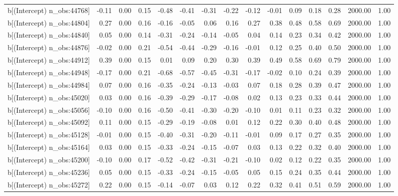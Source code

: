 \begin{table}[ht]
\begin{tabular}{rrrrrrrrrrrrrrr}
  b[(Intercept) n\_obs:44768] & -0.11 & 0.00 & 0.15 & -0.48 & -0.41 & -0.31 & -0.22 & -0.12 & -0.01 & 0.09 & 0.18 & 0.28 & 2000.00 & 1.00 \\ 
  b[(Intercept) n\_obs:44804] & 0.27 & 0.00 & 0.16 & -0.16 & -0.05 & 0.06 & 0.16 & 0.27 & 0.38 & 0.48 & 0.58 & 0.69 & 2000.00 & 1.00 \\ 
  b[(Intercept) n\_obs:44840] & 0.05 & 0.00 & 0.14 & -0.31 & -0.24 & -0.14 & -0.05 & 0.04 & 0.14 & 0.23 & 0.34 & 0.42 & 2000.00 & 1.00 \\ 
  b[(Intercept) n\_obs:44876] & -0.02 & 0.00 & 0.21 & -0.54 & -0.44 & -0.29 & -0.16 & -0.01 & 0.12 & 0.25 & 0.40 & 0.50 & 2000.00 & 1.00 \\ 
  b[(Intercept) n\_obs:44912] & 0.39 & 0.00 & 0.15 & 0.01 & 0.09 & 0.20 & 0.30 & 0.39 & 0.49 & 0.58 & 0.69 & 0.79 & 2000.00 & 1.00 \\ 
  b[(Intercept) n\_obs:44948] & -0.17 & 0.00 & 0.21 & -0.68 & -0.57 & -0.45 & -0.31 & -0.17 & -0.02 & 0.10 & 0.24 & 0.39 & 2000.00 & 1.00 \\ 
  b[(Intercept) n\_obs:44984] & 0.07 & 0.00 & 0.16 & -0.35 & -0.24 & -0.13 & -0.03 & 0.07 & 0.18 & 0.28 & 0.39 & 0.47 & 2000.00 & 1.00 \\ 
  b[(Intercept) n\_obs:45020] & 0.03 & 0.00 & 0.16 & -0.39 & -0.29 & -0.17 & -0.08 & 0.02 & 0.13 & 0.23 & 0.33 & 0.44 & 2000.00 & 1.00 \\ 
  b[(Intercept) n\_obs:45056] & -0.10 & 0.00 & 0.16 & -0.50 & -0.41 & -0.30 & -0.20 & -0.10 & 0.01 & 0.11 & 0.23 & 0.32 & 2000.00 & 1.00 \\ 
  b[(Intercept) n\_obs:45092] & 0.11 & 0.00 & 0.15 & -0.29 & -0.19 & -0.08 & 0.01 & 0.12 & 0.22 & 0.30 & 0.40 & 0.48 & 2000.00 & 1.00 \\ 
  b[(Intercept) n\_obs:45128] & -0.01 & 0.00 & 0.15 & -0.40 & -0.31 & -0.20 & -0.11 & -0.01 & 0.09 & 0.17 & 0.27 & 0.35 & 2000.00 & 1.00 \\ 
  b[(Intercept) n\_obs:45164] & 0.03 & 0.00 & 0.15 & -0.33 & -0.24 & -0.15 & -0.07 & 0.03 & 0.13 & 0.22 & 0.32 & 0.40 & 2000.00 & 1.00 \\ 
  b[(Intercept) n\_obs:45200] & -0.10 & 0.00 & 0.17 & -0.52 & -0.42 & -0.31 & -0.21 & -0.10 & 0.02 & 0.12 & 0.22 & 0.35 & 2000.00 & 1.00 \\ 
  b[(Intercept) n\_obs:45236] & 0.05 & 0.00 & 0.15 & -0.33 & -0.24 & -0.15 & -0.05 & 0.05 & 0.15 & 0.24 & 0.35 & 0.44 & 2000.00 & 1.00 \\ 
  b[(Intercept) n\_obs:45272] & 0.22 & 0.00 & 0.15 & -0.14 & -0.07 & 0.03 & 0.12 & 0.22 & 0.32 & 0.41 & 0.51 & 0.59 & 2000.00 & 1.00 \\ 

\end{tabular}
\end{table}
